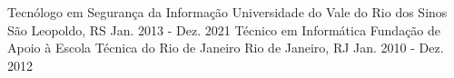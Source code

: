 \begin{cventries}
  \cventry
    {Tecnólogo em Segurança da Informação}
    {Universidade do Vale do Rio dos Sinos}
    {São Leopoldo, RS}
    {Jan. 2013 - Dez. 2021}
    {}
  \cventry
    {Técnico em Informática}
    {Fundação de Apoio à Escola Técnica do Rio de Janeiro}
    {Rio de Janeiro, RJ}
    {Jan. 2010 - Dez. 2012}
    {}
    
\end{cventries}
  